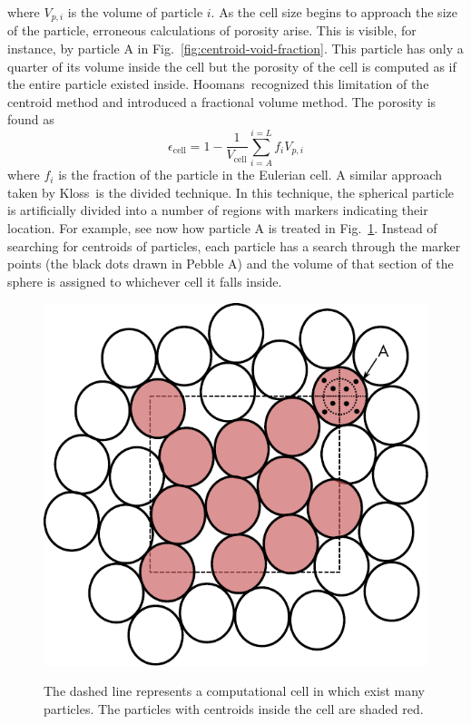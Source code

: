 where $V_{p,i}$ is the volume of particle $i$. As the cell size begins to approach the size of the particle, erroneous calculations of porosity arise. This is visible, for instance, by particle A in Fig.~\ref{fig:centroid-void-fraction}. This particle has only a quarter of its volume inside the cell but the porosity of the cell is computed as if the entire particle existed inside. Hoomans\etal~recognized this limitation of the centroid method and introduced a fractional volume method.\cite{Hoomans1996} The porosity is found as
\begin{equation}
	\epsilon_\text{cell} = 1-\frac{1}{V_\text{cell}}\sum_{i = A}^{i=L}f_iV_{p,i}
\end{equation}
where $f_i$ is the fraction of the particle in the Eulerian cell. A similar approach taken by Kloss\etal~is the divided technique.\cite{Kloss2012} In this technique, the spherical particle is artificially divided into a number of regions with markers indicating their location. For example, see now how particle A is treated in Fig.~\ref{fig:centroid-void-fraction-divided}. Instead of searching for centroids of particles, each particle has a search through the marker points (the black dots drawn in Pebble A) and the volume of that section of the sphere is assigned to whichever cell it falls inside. 
\begin{figure}[t]
	\centering
	\caption{The dashed line represents a computational cell in which exist many particles. The particles with centroids inside the cell are shaded red.}
	\includegraphics[width=\singleimagewidth]{chapters/figures/void-fraction-divided-cell.pdf}\label{fig:centroid-void-fraction-divided}
\end{figure}

